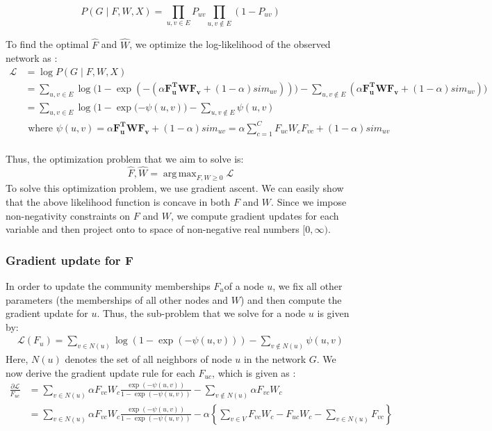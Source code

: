 \documentclass[11pt]{article}
\DeclareMathOperator*{\argmax}{arg\,max}
\begin{document}
\[ P(G \mid F, W, X)  = \prod_{u, v \in E} P_{uv} \prod_{u,v \notin E} (1 - P_{uv}) \]

To find the optimal $\hat{F}$ and $\hat{W}$,  we optimize the log-likelihood of the observed network as : 
\begin{align*}
 \mathcal{L}  &= \log P(G \mid F, W, X)  \\
 &= \sum\limits_{u,v \in E} \log \Big( 1 - \exp( - ( \alpha \mathbf{F_u^{T}} \mathbf{W} \mathbf{F_v} + (1 - \alpha) sim_{uv})) \Big) - \sum\limits_{u, v \notin E} ( \alpha \mathbf{F_u^{T}} \mathbf{W} \mathbf{F_v} + (1 - \alpha) sim_{uv})) \\
&= \sum\limits_{u,v \in E} \log \Big( 1 - \exp( - \psi(u,v) \Big) - \sum\limits_{u, v \notin E} \psi(u,v) \\[4pt]
& \text{ where }  \psi(u,v) =  \alpha \mathbf{F_u^{T}} \mathbf{W} \mathbf{F_v} + (1 - \alpha) sim_{uv} = \alpha \sum\limits_{c=1}^C F_{uc} W_c F_{vc} + (1 - \alpha) sim_{uv}\\
\end{align*}


Thus, the optimization problem that we aim to solve is: 
\[ \hat{F}, \hat{W} = \argmax_{F, W \geq 0} \mathcal{L} \]
To solve this optimization problem, we use gradient ascent. We can easily show that the above likelihood function is concave in both $F$ and $W$. Since we impose non-negativity constraints on $F$ and $W$, we compute gradient updates for each variable and then project onto to space of non-negative real numbers $[0, \infty)$. \\
  
\subsubsection*{Gradient update for F}
In order to update the community memberships $F_u $of a node $u$, we fix all other parameters (the memberships of all other nodes and $W$) and then compute the gradient update for $u$. Thus, the sub-problem that we solve for a node $u$ is given by: 
\begin{align*}
\mathcal{L} (F_u) = \sum\limits_{v \in N(u)} \log (1 - \exp(- \psi(u,v)))  - \sum\limits_{v \notin N(u)} \psi(u,v)
\end{align*}
Here, $N(u)$ denotes the set of all neighbors of node $u$ in the network $G$.
We now derive the gradient update rule for each $F_{uc}$, which is given as : 
\begin{align*}
\frac{\partial \mathcal{L}}{F_{uc}} &= \sum\limits_{v \in N(u) } \alpha F_{vc} W_c \frac{\exp(- \psi(u,v))}{1 - \exp(-\psi(u,v))} - \sum\limits_{v \notin N(u)} \alpha F_{vc} W_c  \\ 
&= \sum\limits_{v \in N(u) } \alpha F_{vc} W_c \frac{\exp(- \psi(u,v))}{1 - \exp(-\psi(u,v))}  - \alpha \left\lbrace \sum\limits_{v \in V} F_{vc} W_c - F_{uc} W_c - \sum\limits_{v \in N(u)} F_{vc} \right\rbrace
\end{align*}
\end{document}
